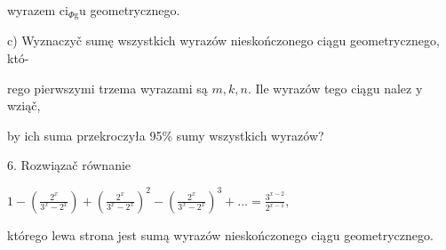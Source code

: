 \documentclass[a4paper,12pt]{article}
\begin{document}
wyrazem $\mathrm{c}\mathrm{i}_{\Phi \mathrm{g}}\mathrm{u}$ geometrycznego.

c) Wyznaczyč sumę wszystkich wyrazów nieskończonego ciągu geometrycznego, któ-

rego pierwszymi trzema wyrazami są $m, k, n$. Ile wyrazów tego ciągu nalez $\mathrm{y}$ wziąč,

by ich suma przekroczyła 95\% sumy wszystkich wyrazów?

6. Rozwiązač równanie

$1-(\displaystyle \frac{2^{x}}{3^{x}-2^{x}})+(\frac{2^{x}}{3^{x}-2^{x}})^{2}-(\frac{2^{x}}{3^{x}-2^{x}})^{3}+\ldots=\frac{3^{x-2}}{2^{x-1}},$

którego lewa strona jest sumą wyrazów nieskończonego ciągu geometrycznego.
\end{document}
